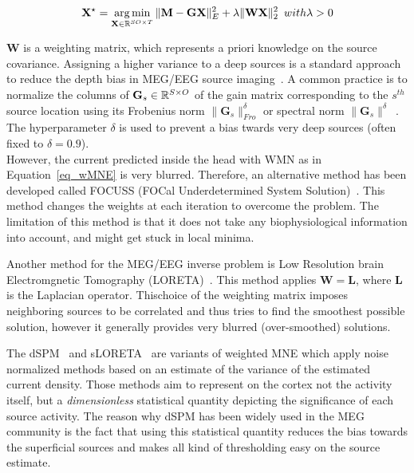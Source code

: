 \begin{equation}\label{eq_wMNE}
\mathbf{X}^\star = \mathop{\mathrm{arg}\,\mathrm{min}}_{\mathbf{X}\in\mathbb{R}^{SO\times T}} \|\mathbf{M}-\mathbf{GX}\|_E^2 + \lambda\|\mathbf{WX}\|_2^2 \hspace{5pt} with \lambda > 0
\end{equation}

$\mathbf{W}$ is a weighting matrix, which represents a priori knowledge on the source covariance. Assigning a higher variance to a deep sources is a standard approach to reduce the depth bias in MEG/EEG source imaging~\cite{lin2006assessing, Gramfort_Strohmeier_Haueisen_Hamalainen_Kowalski13,haufe2008combining, haufe2011large,huang2014meg,palmero2007swloreta}. A common practice is to normalize the columns of $\mathbf{G}_s\in\mathbb{R}^{S\times O}$ of the gain matrix corresponding to the $s^{th}$ source location using its Frobenius norm $\|\mathbf{G}_s\|^\delta_{Fro}$ or spectral norm $\|\mathbf{G}_s\|^\delta$~\cite{gramfort2014mne,Gramfort_Strohmeier_Haueisen_Hamalainen_Kowalski13, kohler2006depth}. The hyperparameter $\delta$ is used to prevent a bias twards very deep sources (often fixed to $\delta=0.9$).\\

However, the current predicted inside the head with WMN as in Equation~\eqref{eq_wMNE} is very blurred. Therefore, an alternative method has been developed called FOCUSS (FOCal Underdetermined System Solution)~\cite{gorodnitsky1995neuromagnetic}. This method changes the weights at each iteration to overcome the problem. The limitation of this method is that it does not take any biophysiological information into account, and might get stuck in local minima.

Another method for the MEG/EEG inverse problem is Low Resolution brain Electromgnetic Tomography (LORETA)~\cite{pascual1994low}. This method applies $\mathbf{W}=\mathbf{L}$, where $\mathbf{L}$ is the Laplacian operator. Thischoice of the weighting matrix imposes neighboring sources to be correlated and thus tries to find the smoothest possible solution, however it generally provides very blurred (over-smoothed) solutions.

The dSPM~\cite{dale2000dynamic} and sLORETA~\cite{pascual2002standardized} are variants of weighted MNE which apply noise normalized methods based on an estimate of the variance of the estimated current density. Those methods aim to represent on the cortex not the activity itself, but a \textit{dimensionless} statistical quantity depicting the significance of each source activity. The reason why dSPM has been widely used in the MEG community is the fact that using this statistical quantity reduces the bias towards the superficial sources and makes all kind of thresholding easy on the source estimate.

